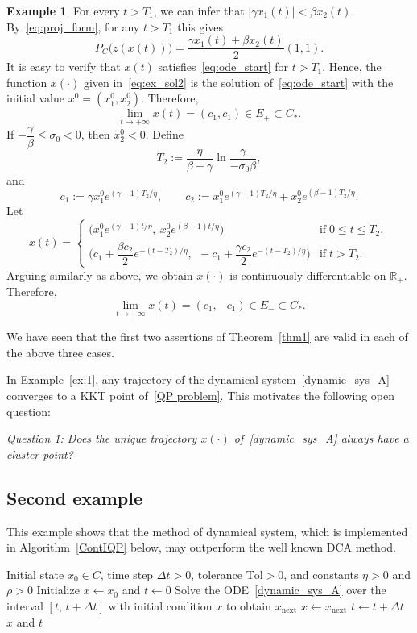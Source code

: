 \documentclass[11pt]{article}
\theoremstyle{definition}
\newtheorem{example}{Example}
\theoremstyle{remark}
\begin{document}
\begin{example}
{			For every $t > T_1$, we can infer that $|\gamma x_1(t)|<\beta x_2(t)$. By~\eqref{eq:proj_form}, for any $t> T_1$ this gives
			$$
			P_C\big(z(x(t))\big)=\dfrac{\gamma x_1(t)+\beta x_2(t)}{2}(1,1).
			$$
			It is easy to verify that $x(t)$ satisfies~\eqref{eq:ode_start} for $t>T_1$. Hence, the function $x(\cdot)$ given in~\eqref{eq:ex_sol2} is the solution of~\eqref{eq:ode_start} with the initial value $x^0=(x_1^0,x_2^0)$. Therefore,
			$$	\lim_{t\to+\infty}x(t) = (c_1,c_1) \in E_+\subset C_*.$$
			If $-\dfrac{\gamma}{\beta}\le \sigma_0<0$, then $x_2^0<0$. Define
			$$
			T_2:=\frac\eta{\beta-\gamma}\ln\dfrac{\gamma}{-\sigma_0\beta},
			$$
			and
			$$
			c_1:=\gamma x_1^0e^{(\gamma-1)T_2/\eta},\qquad c_2:=x_1^0e^{(\gamma-1)T_2/\eta}+x_2^0e^{(\beta-1)T_2/\eta}.
			$$
			Let
			\begin{equation*}\label{eq:ex_sol2_neg}
				x(t) = 
				\begin{cases}
					\Big(x_1^0e^{(\gamma-1)t/\eta},\ x_2^0e^{(\beta-1)t/\eta}\Big) \quad &\text{if}\;0\le t\le T_2,\\[2mm]
					\Big(c_1+\dfrac{\beta c_2}2e^{-(t-T_2)/\eta},\ \ -c_1+\dfrac{\gamma c_2}2e^{-(t-T_2)/\eta}\Big) & \text{if}\;t > T_2.
				\end{cases}
			\end{equation*}
			Arguing similarly as above, we obtain $x(\cdot)$ is continuously differentiable on $\mathbb{R}_+$. Therefore,
			$$
			\lim_{t\to+\infty}x(t) = (c_1,-c_1) \in E_-\subset C_*.
			$$
			
			We have seen that the  first two assertions of Theorem~\ref{thm1} are valid in each of the above three cases.
		}
	\end{example}

In Example~\ref{ex:1}, any trajectory of the dynamical system~\eqref{dynamic_sys_A} converges to a KKT point of~\eqref{QP problem}. This motivates the following open question:

\noindent\textit{Question 1: Does the unique trajectory $x(\cdot)$ of~\eqref{dynamic_sys_A} always have a cluster point?}

\subsection{Second example}
This example shows that the method of dynamical system, which is implemented in Algorithm~\ref{ContIQP} below, may outperform the well known DCA method.

\begin{algorithm}[H]
	\caption{ContIQP: Continuous method for solving IQPs}
	\label{ContIQP}
	\begin{algorithmic}[1]
		\Require Initial state $x_0 \in C$, time step $\Delta t > 0$, tolerance $\mathrm{Tol} > 0$, and constants $\eta > 0$ and $\rho > 0$
		\State Initialize $x \gets x_0$ and $t \gets 0$
		\Statex
		\State Solve the ODE~\eqref{dynamic_sys_A} over the interval $[t,\, t+\Delta t]$ with initial condition $x$ to obtain $x_{\mathrm{next}}$
		\State $x \gets x_{\mathrm{next}}$
		\State $t \gets t + \Delta t$
		\EndWhile
		\Statex
		\State \Return $x$ and $t$ 
	\end{algorithmic}
\end{algorithm}
\end{document}
